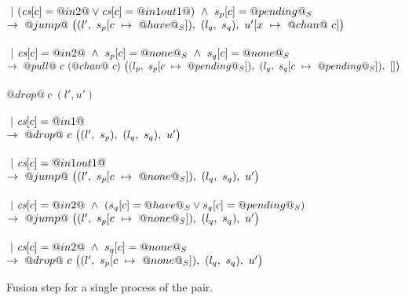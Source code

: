 \begin{figure}
\begin{tabbing}
\> \>  \\
\> \> $~|~(\cs[c]=@in2@ \vee \cs[c]=@in1out1@) ~\wedge~ s_p[c]=@pending@_S$ \\
\> \> $\to~@jump@~
      \nextStep
        {l'}
          {\HeapUpdateOne{c}{@have@_S}{s_p}}
        {l_q}
          {s_q}
        {\HeapUpdateOne{x}{@chan@~c}{u'}}
        $ \\

\> \> \\
\> \> $~|~\cs[c]=@in2@ ~\wedge~ s_p[c]=@none@_S ~\wedge~ s_q[c]=@none@_S$ \\
\> \> $\to~@pull@~c~(@chan@~c)~
      \nextStep
        {l_p}
          {\HeapUpdateOne{c}{@pending@_S}{s_p}}
        {l_q}
          {\HeapUpdateOne{c}{@pending@_S}{s_q}}
        {[]}
  $ \\
\\

\> $@drop@~c~(l',u')$ \\
\> \>  \\
\> \> $~|~\cs[c]=@in1@$ \\
\> \> $\to~@drop@~c~
      \nextStep
        {l'}
          {s_p}
        {l_q}
          {s_q}
        {u'}
      $ \\

\> \> \\
\> \> $~|~\cs[c]=@in1out1@$ \\
\> \> $\to~@jump@~
      \nextStep
        {l'}
          {\HeapUpdateOne{c}{@none@_S}{s_p}}
        {l_q}
          {s_q}
        {u'}
      $ \\

\> \> \\
\> \> $~|~\cs[c]=@in2@ ~\wedge~ (s_q[c]=@have@_S \vee s_q[c]=@pending@_S)$ \\
\> \> $\to~@jump@~
      \nextStep
        {l'}
          {\HeapUpdateOne{c}{@none@_S}{s_p}}
        {l_q}
          {s_q}
        {u'}
      $ \\


\> \> \\
\> \> $~|~\cs[c]=@in2@ ~\wedge~ s_q[c]=@none@_S$ \\
\> \> $\to~@drop@~c~
      \nextStep
        {l'}
          {\HeapUpdateOne{c}{@none@_S}{s_p}}
        {l_q}
          {s_q}
        {u'}
      $
\end{tabbing}

\caption{Fusion step for a single process of the pair.} 

\label{fig:Fusion:Def:Step}
\end{figure}

